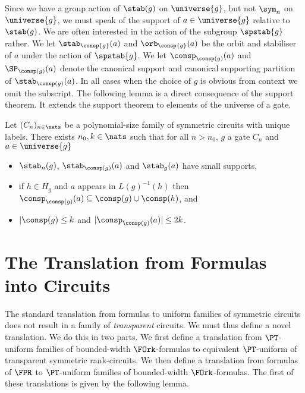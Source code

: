 \documentclass[a4paper,UKenglish]{lipics-v2018}
\begin{document}
Since we have a group action of $\stab(g)$ on $\universe{g}$, but not $\sym_n$
on $\universe{g}$, we must speak of the support of $a \in \universe{g}$ relative
to $\stab(g)$. We are often interested in the action of the subgroup
$\spstab{g}$ rather. We let $\stab_{\consp{g}}(a)$ and $\orb_{\consp{g}}(a)$ be
the orbit and stabiliser of $a$ under the action of $\spstab{g}$. We let
$\consp_{\consp(g)}(a)$ and $\SP_{\consp(g)}(a)$ denote the canonical support
and canonical supporting partition of $\stab_{\consp(g)}(a)$. In all cases when
the choice of $g$ is obvious from context we omit the subscript. The following
lemma is a direct consequence of the support theorem. It extends the support
theorem to elements of the universe of a gate.

\begin{lemma}
  \label{lem:row-column-supports}
  Let $(C_n)_{n \in \nats}$ be a polynomial-size family of symmetric circuits
  with unique labels. There exists $n_0, k \in \nats$ such that for all $n >
  n_0$, $g$ a gate $C_n$ and $a \in \universe{g}$
  \begin{itemize}
  \item $\stab_n(g)$, $\stab_{\consp(g)}(a)$ and $\stab_{g}(a)$ have small
    supports,
  \item if $h \in H_g$ and $a$ appears in $L(g)^{-1}(h)$ then
    $\consp_{\consp(g)}(a) \subseteq \consp(g) \cup \consp(h)$, and
  \item $\vert \consp(g) \leq k$ and $\vert \consp_{\consp(g)}(a) \vert \leq
    2k$.
  \end{itemize}
\end{lemma}


\section{The Translation from Formulas into Circuits}\label{sec:formulas-to-circuits}
The standard translation from formulas to uniform families of symmetric circuits
does not result in a family of \emph{transparent}
circuits. We must thus define a novel translation. We do this in two parts. We
first define a translation from $\PT$-uniform families of bounded-width
$\FOrk$-formulas to equivalent $\PT$-uniform of transparent symmetric
rank-circuits. We then define a translation from formulas of $\FPR$ to
$\PT$-uniform families of bounded-width $\FOrk$-formulas. The first of these
translations is given by the following lemma.
\end{document}
